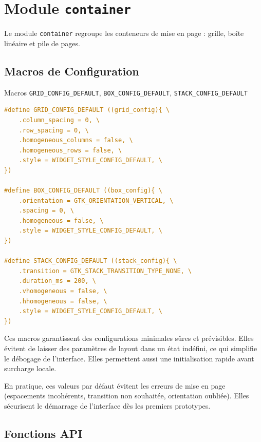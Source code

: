 \section{Module \texttt{container}}

Le module \texttt{container} regroupe les conteneurs de mise en page : grille, boîte linéaire et pile de pages.

\subsection{Macros de Configuration}

\begin{docbox}{Macros \texttt{GRID\_CONFIG\_DEFAULT}, \texttt{BOX\_CONFIG\_DEFAULT}, \texttt{STACK\_CONFIG\_DEFAULT}}
\begin{lstlisting}[language=C]
#define GRID_CONFIG_DEFAULT ((grid_config){ \
    .column_spacing = 0, \
    .row_spacing = 0, \
    .homogeneous_columns = false, \
    .homogeneous_rows = false, \
    .style = WIDGET_STYLE_CONFIG_DEFAULT, \
})

#define BOX_CONFIG_DEFAULT ((box_config){ \
    .orientation = GTK_ORIENTATION_VERTICAL, \
    .spacing = 0, \
    .homogeneous = false, \
    .style = WIDGET_STYLE_CONFIG_DEFAULT, \
})

#define STACK_CONFIG_DEFAULT ((stack_config){ \
    .transition = GTK_STACK_TRANSITION_TYPE_NONE, \
    .duration_ms = 200, \
    .vhomogeneous = false, \
    .hhomogeneous = false, \
    .style = WIDGET_STYLE_CONFIG_DEFAULT, \
})
\end{lstlisting}
\end{docbox}

Ces macros garantissent des configurations minimales sûres et prévisibles. Elles évitent de laisser des paramètres de layout dans un état indéfini, ce qui simplifie le débogage de l'interface. Elles permettent aussi une initialisation rapide avant surcharge locale.

En pratique, ces valeurs par défaut évitent les erreurs de mise en page (espacements incohérents, transition non souhaitée, orientation oubliée). Elles sécurisent le démarrage de l'interface dès les premiers prototypes.

\subsection{Fonctions API}

